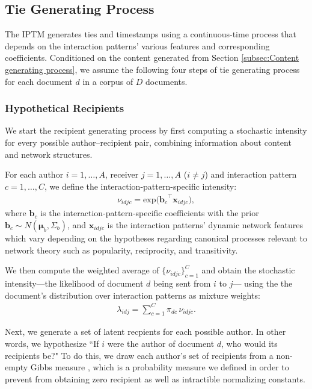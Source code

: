 \documentclass[twoside]{article}
\begin{document}
\subsection{Tie Generating Process}\label{subsec:Tie generating process}
The IPTM generates ties and timestamps using a continuous-time process
that depends on the interaction patterns' various features and
corresponding coefficients. Conditioned on the content generated from Section \ref{subsec:Content generating process}, we assume the following four steps of tie generating process for each document $d$ in a corpus of $D$ documents.

\subsubsection{Hypothetical Recipients}\label{subsubsec:Hypothetical Recipients}
We start the recipient generating process by first computing a stochastic intensity for every possible author--recipient
pair, combining information about content and network structures. 

For each author $i = 1,\ldots,A$, receiver $j = 1,\ldots,A$ ($i \neq j$) and interaction pattern $c=1,\ldots,C$, we define the interaction-pattern-specific intensity:
\begin{align*}
\nu_{idjc} = \mbox{exp}\Big({\boldsymbol{b}_c}^{\top}\boldsymbol{x}_{idjc}\Big),
\end{align*}
where $\boldsymbol{b}_c$ is the interaction-pattern-specific coefficients with the prior $\boldsymbol{b}_c \sim N(\boldsymbol{\mu}_b,\Sigma_b)$, and $\boldsymbol{x}_{idjc}$ is the interaction patterns' dynamic network features which vary depending on the hypotheses regarding canonical processes relevant to network theory such as popularity, reciprocity, and transitivity. 

We then compute the weighted average of $\{\nu_{idjc}\}_{c=1}^C$ and obtain the stochastic intensity---the likelihood of document $d$ being sent from $i$ to $j$--- using the the document's distribution over interaction patterns as mixture weights:
\begin{align*}
\lambda_{idj} =\sum_{c=1}^{C} \pi_{dc}\, \nu_{idjc}.
\end{align*}

Next, we generate a set of latent recpients for each
possible author. In other words, we hypothesize ``If $i$ were the
author of document $d$, who would its recipients be?" To do this, we draw each author's set of recipients from a non-empty Gibbs measure \citep{fellows2017removing}, which is a probability measure we defined in order to prevent from obtaining zero recipient as well as intractible normalizing constants. 
\end{document}
